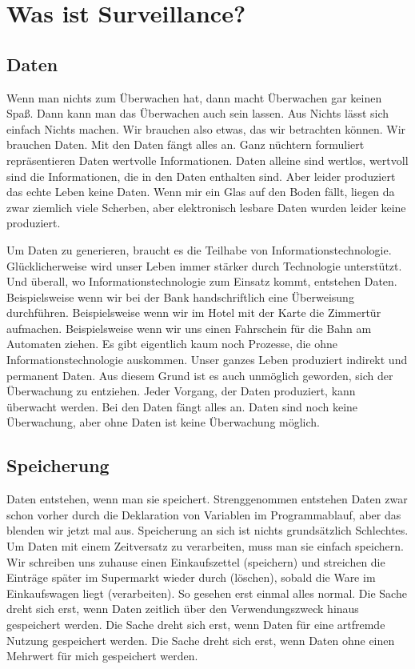 
\section{Was ist Surveillance?}
	\subsection{Daten}
	Wenn man nichts zum Überwachen hat, dann macht Überwachen gar keinen Spaß. Dann kann man das Überwachen auch sein lassen. Aus Nichts lässt sich einfach Nichts machen. Wir brauchen also etwas, das wir betrachten können. Wir brauchen Daten. Mit den Daten fängt alles an. Ganz nüchtern formuliert repräsentieren Daten wertvolle Informationen. Daten alleine sind wertlos, wertvoll sind die Informationen, die in den Daten enthalten sind. Aber leider produziert das echte Leben keine Daten. Wenn mir ein Glas auf den Boden fällt, liegen da zwar ziemlich viele Scherben, aber elektronisch lesbare Daten wurden leider keine produziert.
	
	Um Daten zu generieren, braucht es die Teilhabe von Informationstechnologie. Glücklicherweise wird unser Leben immer stärker durch Technologie unterstützt. Und überall, wo Informationstechnologie zum Einsatz kommt, entstehen Daten. Beispielsweise wenn wir bei der Bank handschriftlich eine Überweisung durchführen. Beispielsweise wenn wir im Hotel mit der Karte die Zimmertür aufmachen. Beispielsweise wenn wir uns einen Fahrschein für die Bahn am Automaten ziehen. Es gibt eigentlich kaum noch Prozesse, die ohne Informationstechnologie auskommen. Unser ganzes Leben produziert indirekt und permanent Daten. Aus diesem Grund ist es auch unmöglich geworden, sich der Überwachung zu entziehen. Jeder Vorgang, der Daten produziert, kann überwacht werden. Bei den Daten fängt alles an. Daten sind noch keine Überwachung, aber ohne Daten ist keine Überwachung möglich.
	
	\subsection{Speicherung}
	Daten entstehen, wenn man sie speichert. Strenggenommen entstehen Daten zwar schon vorher durch die Deklaration von Variablen im Programmablauf, aber das blenden wir jetzt mal aus. Speicherung an sich ist nichts grundsätzlich Schlechtes. Um Daten mit einem Zeitversatz zu verarbeiten, muss man sie einfach speichern. Wir schreiben uns zuhause einen Einkaufszettel (speichern) und streichen die Einträge später im Supermarkt wieder durch (löschen), sobald die Ware im Einkaufswagen liegt (verarbeiten). So gesehen erst einmal alles normal. Die Sache dreht sich erst, wenn Daten zeitlich über den Verwendungszweck hinaus gespeichert werden. Die Sache dreht sich erst, wenn Daten für eine artfremde Nutzung gespeichert werden. Die Sache dreht sich erst, wenn Daten ohne einen Mehrwert für mich gespeichert werden.
	
